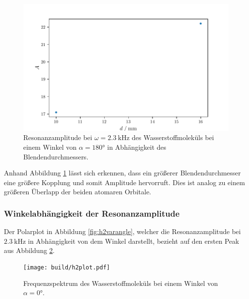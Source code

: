 \begin{figure}
    \centering
    \includegraphics{build/h2dia.pdf}
    \caption{Resonanzamplitude bei $\omega = \qty{2.3}{\kilo\hertz}$ des Wasserstoffmoleküls bei einem Winkel von $\alpha = \ang{180}$ in Abhängigkeit des Blendendurchmessers.}
    \label{fig:h2dia}
\end{figure}
Anhand Abbildung \ref{fig:h2dia} lässt sich erkennen, dass ein größerer Blendendurchmesser eine größere Kopplung und somit Amplitude hervorruft.
Dies ist analog zu einem größeren Überlapp der beiden atomaren Orbitale.
\FloatBarrier

\subsubsection{Winkelabhängigkeit der Resonanzamplitude}
Der Polarplot in Abbildung \ref{fig:h2varangle}, welcher die Resonanzamplitude bei $\qty{2.3}{\kilo\hertz}$ in Abhängigkeit von dem Winkel
darstellt, bezieht auf den ersten Peak aus Abbildung \ref{fig:h2plot}.
\begin{figure}
    \centering
    \texttt{[image: build/h2plot.pdf]}
    \caption{Frequenzspektrum des Wasserstoffmoleküls bei einem Winkel von $\alpha = \ang{0}$.}
    \label{fig:h2plot}
\end{figure}

